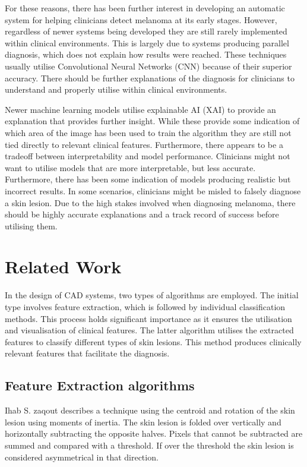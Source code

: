 For these reasons, there has been further interest in developing an automatic system for helping clinicians detect melanoma at its early stages. However, regardless of newer systems being developed they are still rarely implemented within clinical environments. This is largely due to systems producing parallel diagnosis, which does not explain how results were reached\cite{Lipton2018, Andre2017}. These techniques usually utilise Convolutional Neural Networks (CNN) because of their superior accuracy\cite{Wen2022}. There should be further explanations of the diagnosis for clinicians to understand and properly utilise within clinical environments. 

Newer machine learning models utilise explainable AI (XAI) to provide an explanation that provides further insight\cite{skar2017}. While these provide some indication of which area of the image has been used to train the algorithm they are still not tied directly to relevant clinical features. Furthermore, there appears to be a tradeoff between interpretability and model performance. Clinicians might not want to utilise models that are more interpretable, but less accurate. Furthermore, there has been some indication of models producing realistic but incorrect results\cite{Lipton2018}. In some scenarios, clinicians might be misled to falsely diagnose a skin lesion. Due to the high stakes involved when diagnosing melanoma, there should be highly accurate explanations and a track record of success before utilising them.

\section{Related Work}
In the design of CAD systems, two types of algorithms are employed. The initial type involves feature extraction, which is followed by individual classification methods. This process holds significant importance as it ensures the utilisation and visualisation of clinical features. The latter algorithm utilises the extracted features to classify different types of skin lesions. This method produces clinically relevant features that facilitate the diagnosis.

\subsection{Feature Extraction algorithms}
Ihab S. zaqout\cite{Zaqout2016} describes a technique using the centroid and rotation of the skin lesion using moments of inertia. The skin lesion is folded over vertically and horizontally subtracting the opposite halves. Pixels that cannot be subtracted are summed and compared with a threshold. If over the threshold the skin lesion is considered asymmetrical in that direction.

